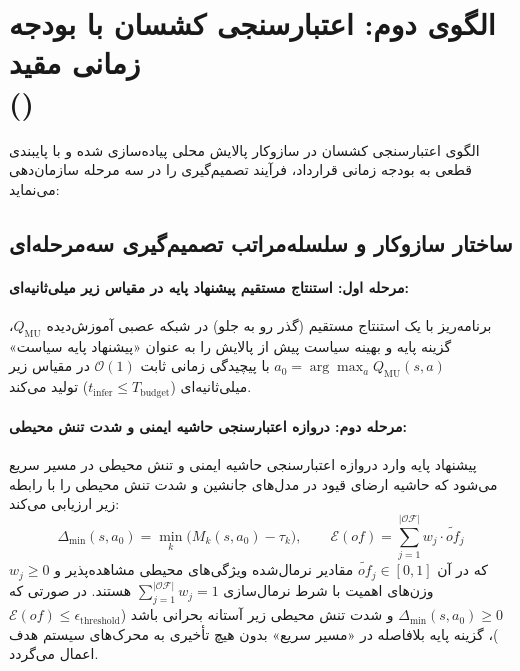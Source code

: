 \documentclass[oneside,openany,phd]{TMU-Thesis}
\begin{document}
\section[الگوی دوم: اعتبارسنجی کشسان با بودجه زمانی مقید (\texorpdfstring{\caepv}{CA-EPV})]{الگوی دوم: اعتبارسنجی کشسان با بودجه زمانی مقید\\ (\texorpdfstring{\caepv}{CA-EPV})}
\label{sec:caepv_pattern}
\label{sec:caepv_pattern_formal}

الگوی اعتبارسنجی کشسان \caepv{} در سازوکار پالایش محلی \pgalr پیاده‌سازی شده و با پایبندی قطعی به بودجه زمانی قرارداد، فرآیند تصمیم‌گیری را در سه مرحله سازمان‌دهی می‌نماید:

\subsection{ساختار سازوکار \pgalr و سلسله‌مراتب تصمیم‌گیری سه‌مرحله‌ای}

\paragraph{مرحله اول: استنتاج مستقیم پیشنهاد پایه در مقیاس زیر میلی‌ثانیه‌ای:}
برنامه‌ریز با یک استنتاج مستقیم (گذر رو به جلو) در شبکه عصبی آموزش‌دیده $Q_{\text{MU}}$، گزینه پایه و بهینه سیاست پیش از پالایش را به عنوان «پیشنهاد پایه سیاست» $a_0 = \arg\max_{a} Q_{\text{MU}}(s, a)$ با پیچیدگی زمانی ثابت $\mathcal{O}(1)$ در مقیاس زیر میلی‌ثانیه‌ای ($t_{\text{infer}} \le T_{\text{budget}}$) تولید می‌کند.

\paragraph{مرحله دوم: دروازه اعتبارسنجی حاشیه ایمنی و شدت تنش محیطی:}
پیشنهاد پایه وارد دروازه اعتبارسنجی حاشیه ایمنی و تنش محیطی در مسیر سریع می‌شود که حاشیه ارضای قیود در مدل‌های جانشین و شدت تنش محیطی را با رابطه زیر ارزیابی می‌کند:
\begin{equation}
\label{eq:margin_gate}
\Delta_{\min}(s, a_0) = \min_{k} \big( M_k(s, a_0) - \tau_k \big), \qquad \mathcal{E}(of) = \sum_{j=1}^{|\mathcal{OF}|} w_j \cdot \widetilde{of}_j
\end{equation}
که در آن $\widetilde{of}_j \in [0, 1]$ مقادیر نرمال‌شده ویژگی‌های محیطی مشاهده‌پذیر و $w_j \ge 0$ وزن‌های اهمیت با شرط نرمال‌سازی $\sum_{j=1}^{|\mathcal{OF}|} w_j = 1$ هستند. در صورتی که $\Delta_{\min}(s, a_0) \ge 0$ و شدت تنش محیطی زیر آستانه بحرانی باشد ($\mathcal{E}(of) \le \epsilon_{\text{threshold}}$)، گزینه پایه بلافاصله در «مسیر سریع» بدون هیچ تأخیری به محرک‌های سیستم هدف اعمال می‌گردد.
\end{document}

